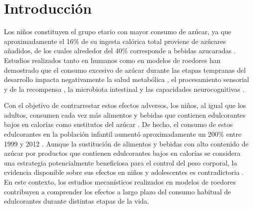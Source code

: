 \chapter{Introducción}\label{cap:introduccion}

Los niños constituyen el grupo etario con mayor consumo de azúcar, ya que aproximadamente el 16\% de su ingesta calórica total proviene de azúcares añadidos, de los cuales alrededor del 40\% corresponde a bebidas azucaradas \cite{ervin2012sugar}. Estudios realizados tanto en humanos como en modelos de roedores han demostrado que el consumo excesivo de azúcar durante las etapas tempranas del desarrollo impacta negativamente la salud metabólica \cite{vos2017sugars,cantoral2016ssb}, el procesamiento sensorial y de la recompensa \cite{decock2016reward,jastreboff2016brain}, la microbiota intestinal \cite{noble2021microbial,noble2017microbiome} y las capacidades neurocognitivas \cite{cohen2018cognition,hsu2015sucrose,noble2019early,tsan2021western}.

Con el objetivo de contrarrestar estos efectos adversos, los niños, al igual que los adultos, consumen cada vez más alimentos y bebidas que contienen edulcorantes bajos en calorías como sustitutos del azúcar \cite{sylvetsky2017lcs,sylvetsky2019pregnant}. De hecho, el consumo de estos edulcorantes en la población infantil aumentó aproximadamente un 200\% entre 1999 y 2012 \cite{sylvetsky2017lcs}. Aunque la sustitución de alimentos y bebidas con alto contenido de azúcar por productos que contienen edulcorantes bajos en calorías se considera una estrategia potencialmente beneficiosa para el control del peso corporal, la evidencia disponible sobre sus efectos en niños y adolescentes es contradictoria \cite{blum2005beverage,forshee2003beverage,striegel2006beverage,berkey2004beverages,sylvetsky2019lcsb,ludwig2001ssb,laska2012dietary}. En este contexto, los estudios mecanísticos realizados en modelos de roedores contribuyen a comprender los efectos a largo plazo del consumo habitual de edulcorantes durante distintas etapas de la vida.


